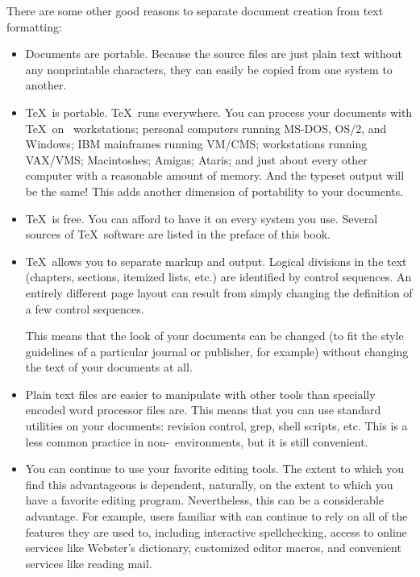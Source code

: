 There are some other good reasons to separate document creation from
text formatting:

\begin{itemize}
  \item Documents are portable.  Because the 
        source files are just plain
        text without any nonprintable characters, they can easily be
        copied from one system to another.
  \item \TeX\ is portable.  
        \TeX\ runs everywhere.  You can
        process your documents with \TeX\ on \Unix\ workstations; personal
        computers running MS-DOS, OS/2, and Windows; IBM mainframes
        running VM/CMS; workstations running VAX/VMS; Macintoshes; Amigas;
        Ataris; and just about every other computer with a reasonable
        amount of memory.  And the typeset output will be the same!
        This adds another dimension of portability to your documents.
  \item \TeX\ is free.  You can afford to have it on every system
        you use.  Several sources of \TeX\ software are listed in
        the preface of this book.  

  \item \TeX\ allows you to separate markup and output.
        Logical divisions in the text (chapters,
        sections, itemized lists, etc.) are identified by control sequences.
        An entirely different page layout can result from simply changing the
        definition of a few control sequences.

        This means that the look of your documents
        can be changed (to fit the style guidelines of a particular
        journal or publisher, for example) without changing the text
        of your documents at all.  

  \item Plain text files are easier to manipulate with other tools than
        specially encoded word processor files are.  This
        means that you can use standard utilities on your documents:
        revision control, grep, shell scripts, etc.  This is a less common
        practice in non-\Unix\ environments, but it is still convenient.

  \item You can continue to use your favorite editing tools.  The extent
        to which you find this advantageous is dependent, naturally, on the
        extent to which you have a favorite editing program.
        Nevertheless, this can be a considerable advantage.  For example, 
        users familiar with  can 
        continue to rely on all of the
        features they are used to, including interactive spellchecking,
        access to online services like Webster's dictionary, customized
        editor macros, and convenient services like reading mail.


\end{itemize}
